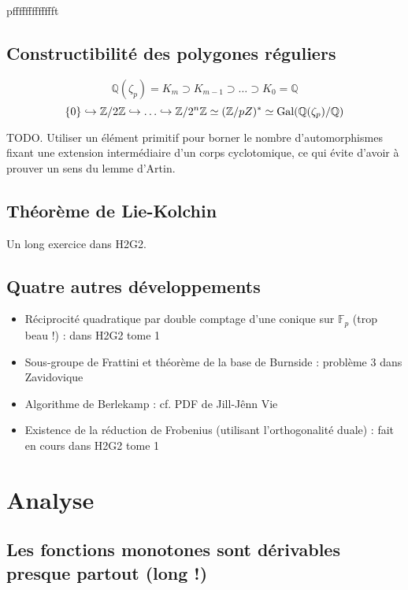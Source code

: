 \documentclass[a4paper, 11pt]{article}
\def\F{\mathbb{F}}
\def\Z{\mathbb{Z}}
\def\Q{\mathbb{Q}}
\begin{document}
pffffffffffffft

\newpage

\subsection{Constructibilité des polygones réguliers}

\[ \Q(\zeta_p) = K_m \supset K_{m-1} \supset \ldots \supset K_0 = \Q \]
\[ \{0\} \hookrightarrow \Z/2\Z \hookrightarrow \ldots \hookrightarrow \Z/2^n\Z
  \simeq (\Z/pZ)^* \simeq \textnormal{Gal}(\Q(\zeta_p)/\Q) \]

TODO. Utiliser un élément primitif pour borner le nombre d'automorphismes fixant
une extension intermédiaire d'un corps cyclotomique, ce qui évite d'avoir à
prouver un sens du lemme d'Artin.

\subsection{Théorème de Lie-Kolchin}

Un long exercice dans H2G2.

\subsection{Quatre autres développements}

\begin{itemize}
\item Réciprocité quadratique par double comptage d'une conique sur $\F_p$ (trop
  beau !) : dans H2G2 tome 1
\item Sous-groupe de Frattini et théorème de la base de Burnside : problème 3
  dans Zavidovique
\item Algorithme de Berlekamp : cf. PDF de Jill-Jênn Vie
\item Existence de la réduction de Frobenius (utilisant l'orthogonalité duale) :
  fait en cours dans H2G2 tome 1
\end{itemize}


\newpage

\section{Analyse}

\subsection{Les fonctions monotones sont dérivables presque partout (long !)}
\end{document}
